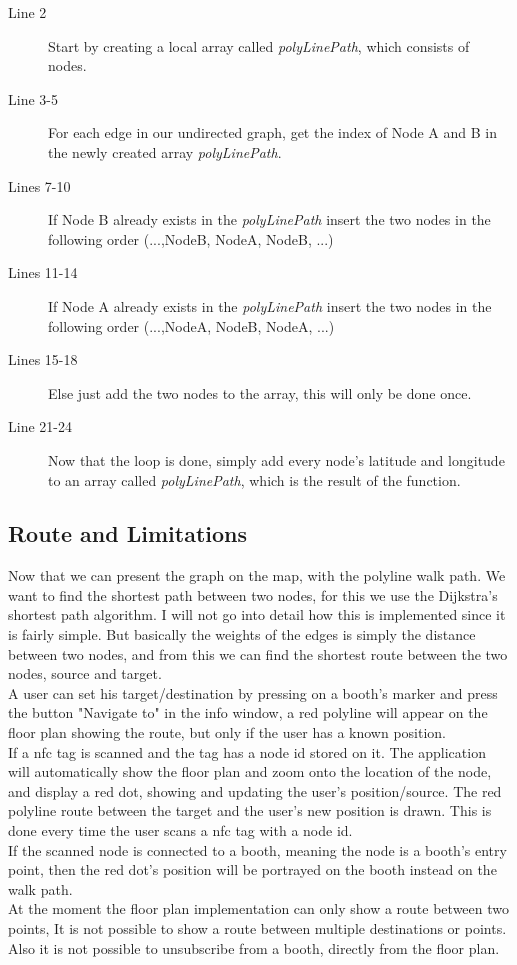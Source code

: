 \begin{description}
\item[Line 2] Start by creating a local array called  \textit{polyLinePath}, which consists of nodes.
\item[Line 3-5] For each edge in our undirected graph, get the index of Node A and B in the newly created array \textit{polyLinePath}.
\item[Lines 7-10] If Node B already exists in the \textit{polyLinePath} insert the two nodes in the following order (...,NodeB, NodeA, NodeB, ...)
\item[Lines 11-14] If Node A already exists in the \textit{polyLinePath} insert the two nodes in the following order (...,NodeA, NodeB, NodeA, ...)
\item[Lines 15-18] Else just add the two nodes to the array, this will only be done once.
\item[Line 21-24] Now that the loop is done, simply add every node's latitude and longitude to an array called \textit{polyLinePath}, which is the result of the function. 
\end{description}

\subsection*{Route and Limitations}
Now that we can present the graph on the map, with the polyline walk path. We want to find the shortest path between two nodes, for this we use the Dijkstra's shortest path algorithm. I will not go into detail how this is implemented since it is fairly simple. But basically the weights of the edges is simply the distance between two nodes, and from this we can find the shortest route between the two nodes, source and target.\\ 
A user can set his target/destination by pressing on a booth's marker and press the button "Navigate to" in the info window, a red polyline will appear on the floor plan showing the route, but only if the user has a known position.\\
If a \ac{nfc} tag is scanned and the tag has a node id stored on it. The application will automatically show the floor plan and zoom onto the location of the node, and display a red dot, showing and updating the user's position/source. The red polyline route between the target and the user's new position is drawn. This is done every time the user scans a \ac{nfc} tag with a node id.\\
If the scanned node is connected to a booth, meaning the node is a booth's entry point, then the red dot's position will be portrayed on the booth instead on the walk path.\\ 
At the moment the floor plan implementation can only show a route between two points, It is not possible to show a route between multiple destinations or points. Also it is not possible to unsubscribe from a booth, directly from the floor plan.







	
